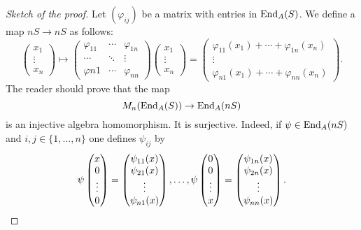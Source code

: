 \begin{proof}[Sketch of the proof]
	Let $(\varphi_{ij})$ be a matrix with entries in $\operatorname{End}_A(S)$. We define a map
	$nS\to nS$ as follows:
	\[
	\begin{pmatrix}
	x_1\\
	\vdots\\
	x_n	
	\end{pmatrix}
	\mapsto 
		\begin{pmatrix}
			\varphi_{11} & \cdots & \varphi_{1n}\\
			\cdots & \ddots & \vdots\\
			\varphi{n1} & \cdots & \varphi_{nn}
		\end{pmatrix}
		\begin{pmatrix}
		x_1\\
		\vdots\\
		x_n	
		\end{pmatrix}
		=\begin{pmatrix}
			\varphi_{11}(x_1)+\cdots+\varphi_{1n}(x_n)\\
			\vdots\\
			\varphi_{n1}(x_1)+\cdots+\varphi_{nn}(x_n)
		\end{pmatrix}.
	\]
	The reader should prove that the map  
	\[
		M_n(\operatorname{End}_A(S))\to\operatorname{End}_A(nS)
	\]
	is an injective algebra homomorphism. 
	It is surjective. Indeed, if $\psi\in\operatorname{End}_A(nS)$ and 
	$i,j\in\{1,\dots,n\}$ one defines $\psi_{ij}$ by 
	\[
		\psi\begin{pmatrix}
		x\\
		0\\
		\vdots\\
		0	
		\end{pmatrix}
		=\begin{pmatrix}
		\psi_{11}(x)\\
		\psi_{21}(x)\\
		\vdots\\
		\psi_{n1}(x)
		\end{pmatrix},\dots,
		\psi\begin{pmatrix}
		0\\
		0\\
		\vdots\\
		x	
		\end{pmatrix}
		=\begin{pmatrix}
		\psi_{1n}(x)\\
		\psi_{2n}(x)\\
		\vdots\\
		\psi_{nn}(x)
		\end{pmatrix}.\qedhere
	\]
\end{proof}

